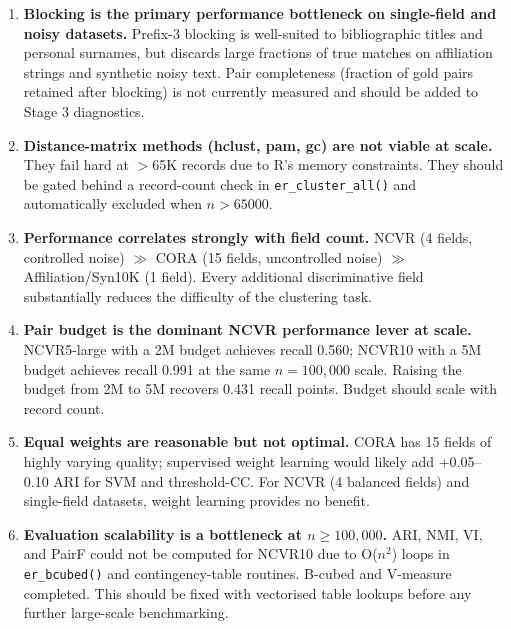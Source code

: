 \documentclass[11pt, a4paper]{article}
\begin{document}
\begin{enumerate}[leftmargin=*, label=\arabic*.]
  \item \textbf{Blocking is the primary performance bottleneck on single-field and
        noisy datasets.}
        Prefix-3 blocking is well-suited to bibliographic titles and personal surnames,
        but discards large fractions of true matches on affiliation strings and
        synthetic noisy text. Pair completeness (fraction of gold pairs retained after
        blocking) is not currently measured and should be added to Stage 3 diagnostics.

  \item \textbf{Distance-matrix methods (hclust, pam, gc) are not viable at scale.}
        They fail hard at $>$65K records due to R's memory constraints. They should
        be gated behind a record-count check in \texttt{er\_cluster\_all()} and
        automatically excluded when $n > 65000$.

  \item \textbf{Performance correlates strongly with field count.}
        NCVR (4 fields, controlled noise) $\gg$ CORA (15 fields, uncontrolled noise)
        $\gg$ Affiliation/Syn10K (1 field). Every additional discriminative field
        substantially reduces the difficulty of the clustering task.

  \item \textbf{Pair budget is the dominant NCVR performance lever at scale.}
        NCVR5-large with a 2M budget achieves recall 0.560; NCVR10 with a 5M budget
        achieves recall 0.991 at the same $n=100{,}000$ scale. Raising the budget from
        2M to 5M recovers 0.431 recall points. Budget should scale with record count.

  \item \textbf{Equal weights are reasonable but not optimal.}
        CORA has 15 fields of highly varying quality; supervised weight learning would
        likely add +0.05--0.10 ARI for SVM and threshold-CC. For NCVR (4 balanced
        fields) and single-field datasets, weight learning provides no benefit.

  \item \textbf{Evaluation scalability is a bottleneck at $n \geq 100{,}000$.}
        ARI, NMI, VI, and PairF could not be computed for NCVR10 due to O($n^2$)
        loops in \texttt{er\_bcubed()} and contingency-table routines. B-cubed and
        V-measure completed. This should be fixed with vectorised table lookups before
        any further large-scale benchmarking.

\end{enumerate}
\end{document}
